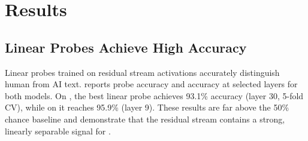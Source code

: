 \section{Results}
\label{sec:results}

\subsection{Linear Probes Achieve High Accuracy}
\label{sec:probes}

Linear probes trained on residual stream activations accurately distinguish human from AI text.
 reports probe accuracy and \diffmean accuracy at selected layers for both models.
On \pythia, the best linear probe achieves 93.1\% accuracy (layer 30, 5-fold CV), while on \qwen it reaches 95.9\% (layer 9).
These results are far above the 50\% chance baseline and demonstrate that the residual stream contains a strong, linearly separable signal for \aistyle.

\begin{table}[t]
    \centering
    \caption{Linear probe accuracy (5-fold CV) and \diffmean 1D accuracy by layer. Best results per model in \textbf{bold}.}
    \label{tab:probe_results}
\end{table}

